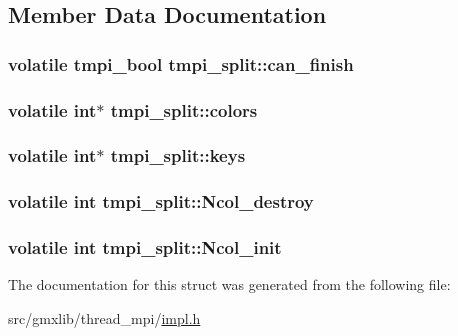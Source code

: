 \subsection{\-Member \-Data \-Documentation}
\hypertarget{structtmpi__split_a2f0ccbbd63a05460cf84848a21950669}{
\subsubsection[{can\-\_\-finish}]{\setlength{\rightskip}{0pt plus 5cm}volatile {\bf tmpi\-\_\-bool} {\bf tmpi\-\_\-split\-::can\-\_\-finish}}}\label{structtmpi__split_a2f0ccbbd63a05460cf84848a21950669}
\hypertarget{structtmpi__split_a75f82d278c2cef170f4c74624eb3d4f0}{
\subsubsection[{colors}]{\setlength{\rightskip}{0pt plus 5cm}volatile int$\ast$ {\bf tmpi\-\_\-split\-::colors}}}\label{structtmpi__split_a75f82d278c2cef170f4c74624eb3d4f0}
\hypertarget{structtmpi__split_aea289aa686b4a4e5e9d469a0f2f0adc8}{
\subsubsection[{keys}]{\setlength{\rightskip}{0pt plus 5cm}volatile int$\ast$ {\bf tmpi\-\_\-split\-::keys}}}\label{structtmpi__split_aea289aa686b4a4e5e9d469a0f2f0adc8}
\hypertarget{structtmpi__split_afb80611cc1cd63e7f3d10d461176f198}{
\subsubsection[{\-Ncol\-\_\-destroy}]{\setlength{\rightskip}{0pt plus 5cm}volatile int {\bf tmpi\-\_\-split\-::\-Ncol\-\_\-destroy}}}\label{structtmpi__split_afb80611cc1cd63e7f3d10d461176f198}
\hypertarget{structtmpi__split_ac00b33e1b0bfe014f97ffe83bfc0705d}{
\subsubsection[{\-Ncol\-\_\-init}]{\setlength{\rightskip}{0pt plus 5cm}volatile int {\bf tmpi\-\_\-split\-::\-Ncol\-\_\-init}}}\label{structtmpi__split_ac00b33e1b0bfe014f97ffe83bfc0705d}


\-The documentation for this struct was generated from the following file\-:\begin{DoxyCompactItemize}
\item 
src/gmxlib/thread\-\_\-mpi/\hyperlink{impl_8h}{impl.\-h}\end{DoxyCompactItemize}
